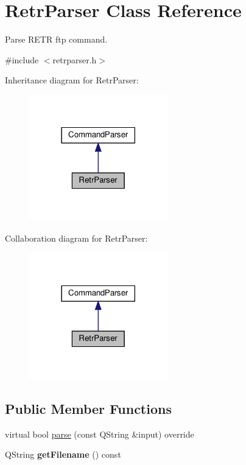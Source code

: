 \hypertarget{classRetrParser}{}\section{Retr\+Parser Class Reference}
\label{classRetrParser}


Parse R\+E\+TR ftp command.  




{\ttfamily \#include $<$retrparser.\+h$>$}



Inheritance diagram for Retr\+Parser\+:\nopagebreak
\begin{figure}[H]
\begin{center}
\leavevmode
\includegraphics[width=170pt]{d7/da6/classRetrParser__inherit__graph}
\end{center}
\end{figure}


Collaboration diagram for Retr\+Parser\+:\nopagebreak
\begin{figure}[H]
\begin{center}
\leavevmode
\includegraphics[width=170pt]{d4/dbd/classRetrParser__coll__graph}
\end{center}
\end{figure}
\subsection*{Public Member Functions}
\begin{DoxyCompactItemize}
\item 
virtual bool \hyperlink{classRetrParser_ace04fa9e7c638452de2d40dacc5a0471}{parse} (const Q\+String \&input) override
\item 
\mbox{\label{classRetrParser_afbb4e8e78bdc67aed939bc556577e995}} 
Q\+String {\bfseries get\+Filename} () const
\end{DoxyCompactItemize}


